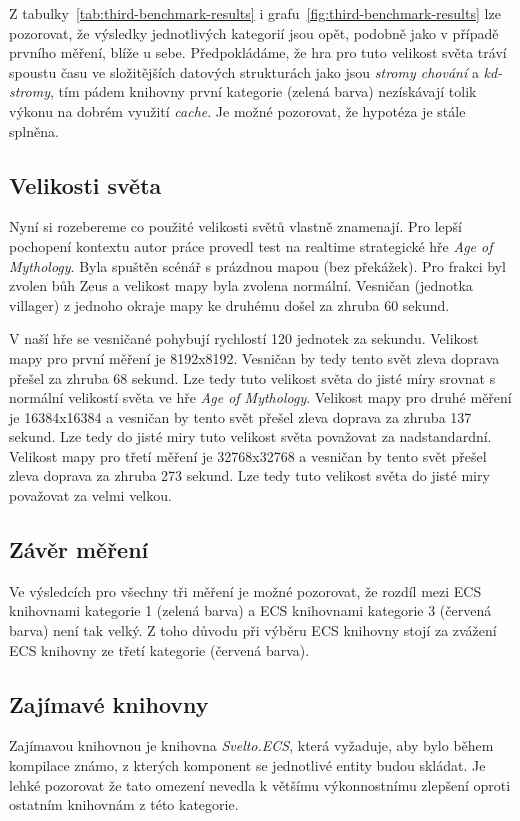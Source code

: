 Z tabulky~\ref{tab:third-benchmark-results} i grafu~\ref{fig:third-benchmark-results} lze pozorovat, že výsledky jednotlivých kategorií jsou opět, podobně jako v případě prvního měření, blíže u sebe. Předpokládáme, že hra pro tuto velikost světa tráví spoustu času ve složitějších datových strukturách jako jsou \textit{stromy chování} a \textit{kd-stromy}, tím pádem knihovny první kategorie (zelená barva) nezískávají tolik výkonu na dobrém využití \textit{cache}. Je možné pozorovat, že hypotéza je stále splněna.

\subsection{Velikosti světa}
Nyní si rozebereme co použité velikosti světů vlastně znamenají. Pro lepší pochopení kontextu autor práce provedl test na realtime strategické hře \textit{Age of Mythology}. Byla spuštěn scénář s prázdnou mapou (bez překážek). Pro frakci byl zvolen bůh Zeus a velikost mapy byla zvolena normální. Vesničan (jednotka villager) z jednoho okraje mapy ke druhému došel za zhruba 60 sekund.

V naší hře se vesničané pohybují rychlostí 120 jednotek za sekundu. Velikost mapy pro první měření je 8192x8192. Vesničan by tedy tento svět zleva doprava přešel za zhruba 68 sekund. Lze tedy tuto velikost světa do jisté míry srovnat s normální velikostí světa ve hře \textit{Age of Mythology}. Velikost mapy pro druhé měření je 16384x16384 a vesničan by tento svět přešel zleva doprava za zhruba 137 sekund. Lze tedy do jisté miry tuto velikost světa považovat za nadstandardní. Velikost mapy pro třetí měření je 32768x32768 a vesničan by tento svět přešel zleva doprava za zhruba 273 sekund. Lze tedy tuto velikost světa do jisté miry považovat za velmi velkou.

\subsection{Závěr měření}
Ve výsledcích pro všechny tři měření je možné pozorovat, že rozdíl mezi ECS knihovnami kategorie 1 (zelená barva) a ECS knihovnami kategorie 3 (červená barva) není tak velký. Z toho důvodu při výběru ECS knihovny stojí za zvážení ECS knihovny ze třetí kategorie (červená barva).

\subsection{Zajímavé knihovny}
Zajímavou knihovnou je knihovna \textit{Svelto.ECS}, která vyžaduje, aby bylo během kompilace známo, z kterých komponent se jednotlivé entity budou skládat. Je lehké pozorovat že tato omezení nevedla k většímu výkonnostnímu zlepšení oproti ostatním knihovnám z této kategorie.

